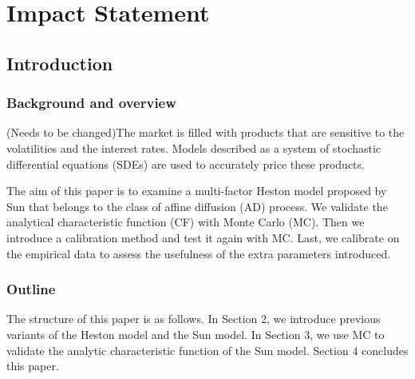 \documentclass[12pt]{report}
\begin{document}
\thispagestyle{empty}
\chapter*{Impact Statement}

\newpage
\tableofcontents 
\thispagestyle{empty}
\newpage 
\listoffigures
\listoftables 
\thispagestyle{empty}
\newpage
\setcounter{page}{1}




\section{Introduction} 
\subsection{Background and overview}
(Needs to be changed)The market is filled with products that are sensitive to the volatilities and the interest rates. Models described as a system of stochastic differential equations (SDEs) are used to accurately price these products. 

The aim of this paper is to examine a multi-factor Heston model proposed by Sun \cite{sun2021explicitly} that belongs to the class of affine diffusion (AD) process. We validate the analytical characteristic function (CF) with Monte Carlo (MC). Then we introduce a calibration method and test it again with MC. Last, we calibrate on the empirical data to assess the usefulness of the extra parameters introduced. 
\subsection{Outline}
The structure of this paper is as follows. In Section 2, we introduce previous variants of the Heston model and the Sun model. In Section 3, we use MC to validate the analytic characteristic function of the Sun model. Section 4 concludes this paper.
\end{document}
